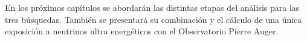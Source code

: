 En los próximos capítulos se abordarán las distintas etapas del análisis para las tres búsquedas.
Tambi\'en se presentar\'a su combinaci\'on y el c\'alculo de una \'unica exposici\'on a neutrinos ultra energ\'eticos con el Observatorio Pierre Auger.



